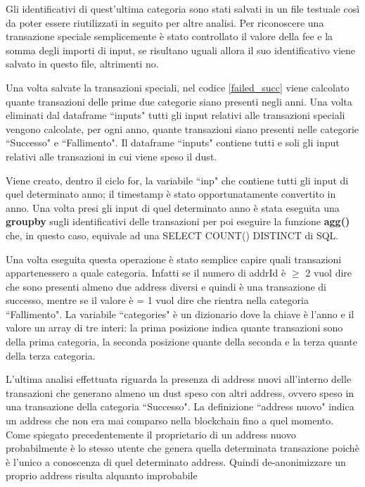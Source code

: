 Gli identificativi di quest'ultima categoria sono stati salvati in un file testuale così da poter essere riutilizzati in seguito per altre analisi. Per riconoscere una transazione speciale semplicemente è stato controllato il valore della fee e la somma degli importi di input, se risultano uguali allora il suo identificativo viene salvato in questo file, altrimenti no.

Una volta salvate la transazioni speciali, nel codice \ref{failed_succ} viene calcolato quante transazioni delle prime due categorie siano presenti negli anni. Una volta eliminati dal dataframe ``inputs" tutti gli input relativi alle transazioni speciali vengono calcolate, per ogni anno, quante transazioni siano presenti nelle categorie ``Successo" e ``Fallimento". Il dataframe ``inputs" contiene tutti e soli gli input relativi alle transazioni in cui viene speso il dust. 

Viene creato, dentro il ciclo for, la variabile ``inp" che contiene tutti gli input di quel determinato anno; il timestamp è stato opportunatamente convertito in anno. Una volta presi gli input di quel determinato anno è stata eseguita una \textbf{groupby} sugli identificativi delle transazioni per poi eseguire la funzione \textbf{agg({})} che, in questo caso, equivale ad una SELECT COUNT() DISTINCT di SQL.

Una volta eseguita questa operazione è stato semplice capire quali transazioni appartenessero a quale categoria. Infatti se il numero di addrId è $\ge$ 2 vuol dire che sono presenti almeno due address diversi e quindi è una transazione di successo, mentre se il valore è = 1 vuol dire che rientra nella categoria ``Fallimento". 
La variabile ``categories" è un dizionario dove la chiave è l'anno e il valore un array di tre interi: la prima posizione indica quante transazioni sono della prima categoria, la seconda posizione quante della seconda e la terza quante della terza categoria. 


L'ultima analisi effettuata riguarda la presenza di address nuovi all'interno delle transazioni che generano almeno un dust speso con altri address, ovvero speso in una transazione della categoria ``Successo". La definizione ``address nuovo" indica un address che non era mai comparso nella blockchain fino a quel momento. Come spiegato precedentemente il proprietario di un address nuovo probabilmente è lo stesso utente che genera quella determinata transazione poichè è l’unico a conoscenza di quel determinato address. Quindi de-anonimizzare un proprio address risulta alquanto improbabile

